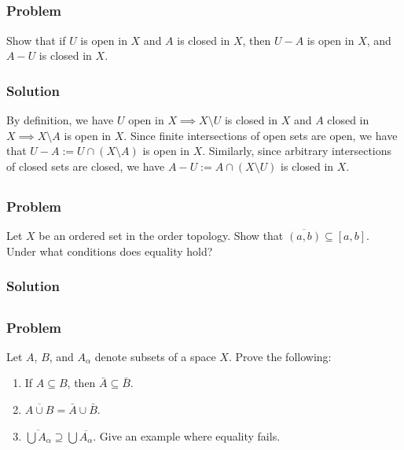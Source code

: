 \subsection{}

\subsubsection{Problem}
Show that if $U$ is open in $X$ and $A$ is closed in $X$, then $U-A$ is open in $X$, and $A-U$ is closed in $X$.

\subsubsection{Solution}
By definition, we have $U$ open in $X \implies X\setminus U$ is closed in $X$ and $A$ closed in $X \implies X\setminus A$ is open in $X$. Since finite intersections of open sets are open, we have that $U-A := U \cap (X\setminus A)$ is open in $X$. Similarly, since arbitrary intersections of closed sets are closed, we have $A-U := A \cap (X\setminus U)$ is closed in $X$.


\subsection{}

\subsubsection{Problem}
Let $X$ be an ordered set in the order topology. Show that $\overline{(a, b)} \subseteq [a, b]$. Under what conditions does equality hold?

\subsubsection{Solution}
\todo


\subsection{}

\subsubsection{Problem}
Let $A$, $B$, and $A_\alpha$ denote subsets of a space $X$. Prove the following:
\begin{enumerate}
 \item If $A \subseteq B$, then $\bar{A} \subseteq \bar{B}$.
 \item $\overline{A \cup B} = \bar A \cup \bar B$.
 \item $\overline{\bigcup A_\alpha} \supseteq \bigcup \overline{A_\alpha}$. Give an example where equality fails.
\end{enumerate}

